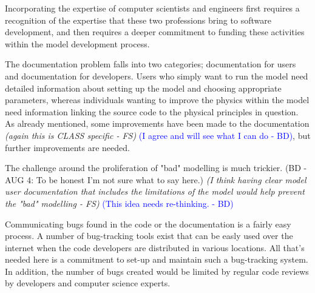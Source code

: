 \documentclass[hess]{copernicus}
\begin{document}
Incorporating the expertise of computer scientists and engineers first requires a recognition of the expertise that these two professions bring to software development, and then requires a deeper commitment to funding these activities within the model development process.

The documentation problem falls into two categories; documentation for users and documentation for developers. Users who simply want to run the model need detailed information about setting up the model and choosing appropriate parameters, whereas individuals wanting to improve the physics within the model need information linking the source code to the physical principles in question. As already mentioned, some improvements have been made to the documentation {\em (again this is CLASS specific - FS)}\textcolor{blue}{ (I agree and will see what I can do - BD)}, but further improvements are needed.

The challenge around the proliferation of "bad" modelling is much trickier. (BD - AUG 4: To be honest I'm not sure what to say here.) {\em (I think having clear model user documentation that includes the limitations of the model would help prevent the "bad" modelling - FS)}\textcolor{blue}{ (This idea needs re-thinking. - BD)}

Communicating bugs found in the code or the documentation is a fairly easy process. A number of bug-tracking tools exist that can be easly used over the internet when the code developers are distributed in various locations. All that's needed here is a commitment to set-up and maintain such a bug-tracking system. In addition, the number of bugs created would be limited by regular code reviews by developers and computer science experts.
\end{document}
